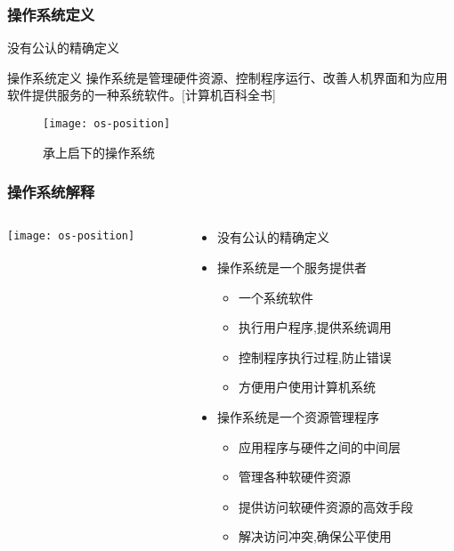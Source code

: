 \begin{frame}[plain]

\frametitle{操作系统定义}


没有公认的精确定义 \pause

\begin{block}{操作系统定义}
操作系统是管理硬件资源、控制程序运行、改善人机界面和为应用软件提供服务的一种系统软件。[计算机百科全书]
\end{block} \pause


\begin{figure}
	\centering
	\texttt{[image: os-position]}
	\caption{承上启下的操作系统}
\end{figure}

\end{frame}


\begin{frame}

\frametitle{操作系统解释}

\begin{columns}

\begin{column}{.55\linewidth}

	\texttt{[image: os-position]}

\end{column}

\begin{column}{0.7\linewidth}
	
\begin{itemize}
\item 没有公认的精确定义 \pause
\item 操作系统是一个服务提供者
	\begin{itemize}
	\item 一个系统软件
	\item 执行用户程序,提供系统调用
	\item 控制程序执行过程,防止错误
	\item 方便用户使用计算机系统
	\end{itemize}
	\pause
	\item 操作系统是一个资源管理程序
	\begin{itemize}
		\item 应用程序与硬件之间的中间层
		\item 管理各种软硬件资源
		\item 提供访问软硬件资源的高效手段
		\item 解决访问冲突,确保公平使用
	\end{itemize}
\end{itemize}

\end{column}

\end{columns}

\end{frame}


